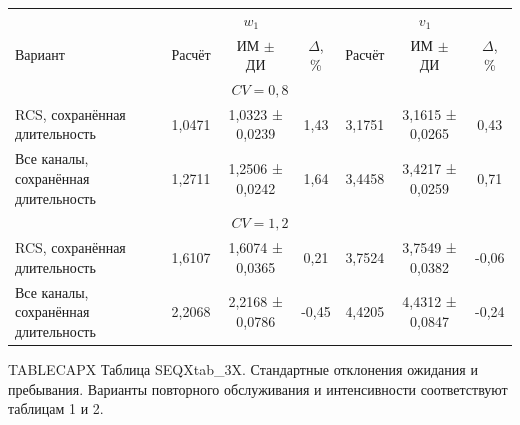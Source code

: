 \setlength{\tabcolsep}{3pt}
\begin{tabular}{p{4.2cm}cccccc}
\toprule
 & \multicolumn{3}{c}{$w_1$} & \multicolumn{3}{c}{$v_1$} \\
Вариант & Расчёт & ИМ $\pm$ ДИ & $\Delta$, \% & Расчёт & ИМ $\pm$ ДИ & $\Delta$, \% \\
\midrule
\multicolumn{7}{c}{$CV=0,8$} \\
RCS, сохранённая длительность & 1,0471 & 1,0323 ± 0,0239 & 1,43 & 3,1751 & 3,1615 ± 0,0265 & 0,43 \\
Все каналы, сохранённая длительность & 1,2711 & 1,2506 ± 0,0242 & 1,64 & 3,4458 & 3,4217 ± 0,0259 & 0,71 \\
\multicolumn{7}{c}{$CV=1,2$} \\
RCS, сохранённая длительность & 1,6107 & 1,6074 ± 0,0365 & 0,21 & 3,7524 & 3,7549 ± 0,0382 & -0,06 \\
Все каналы, сохранённая длительность & 2,2068 & 2,2168 ± 0,0786 & -0,45 & 4,4205 & 4,4312 ± 0,0847 & -0,24 \\
\bottomrule
\end{tabular}




\noindent TABLECAPX Таблица SEQXtab_3X. Стандартные отклонения ожидания и пребывания. Варианты повторного обслуживания и интенсивности соответствуют таблицам 1 и 2.\par

